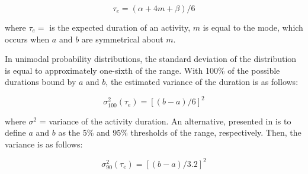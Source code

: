 \begin{equation}
\label{eq:mediaPERT}
\tau_e = (\alpha + 4m + \beta) / 6
\end{equation}

where $\tau_e = $ is the expected duration of an activity, $m$ is equal to the mode, which occurs when $a$ and $b$ are symmetrical about $m$.

In unimodal probability distributions, the standard deviation of the distribution is equal to approximately one-sixth of the range. With 100\% of the possible durations bound by $a$ and $b$, the estimated variance of the duration is as follows:

\begin{equation}
\label{eq:varianciaPERT}
\sigma^2_100(\tau_e) = [(b - a) / 6]^2
\end{equation}

where $\sigma^2$ = variance of the activity duration. An alternative, presented in \cite{cottrell1999simplified} is to define $a$ and $b$ as the 5\% and 95\% thresholds of the range, respectively. Then, the variance is as follows:

\begin{equation}
\label{eq:variancia2PERT}
\sigma^2_90(\tau_e) = [(b - a) / 3.2]^2
\end{equation}

